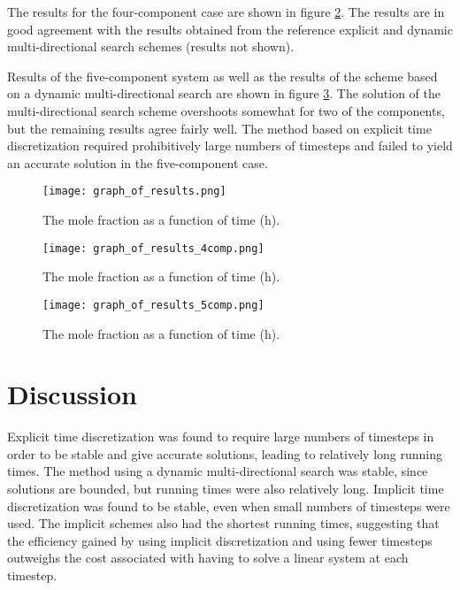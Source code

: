 \documentclass[11]{Report}
\begin{document}
The results for the four-component case are shown in figure \ref{fig:fig_2}. The results are in good agreement with the results obtained from the reference explicit and dynamic multi-directional search schemes (results not shown).

Results of the five-component system as well as the results of the scheme based on a dynamic multi-directional search are shown in figure \ref{fig:fig_3}. The solution of the multi-directional search scheme overshoots somewhat for two of the components, but the remaining results agree fairly well. The method based on explicit time discretization required prohibitively large numbers of timesteps and failed to yield an accurate solution in the five-component case.

\begin{figure}
\texttt{[image: graph\_of\_results.png]}
\caption{The mole fraction as a function of time (h).}
\label{fig:fig_1}
\end{figure}

\begin{figure}
\texttt{[image: graph\_of\_results\_4comp.png]}
\caption{The mole fraction as a function of time (h).}
\label{fig:fig_2}
\end{figure}

\begin{figure}
\texttt{[image: graph\_of\_results\_5comp.png]}
\caption{The mole fraction as a function of time (h).}
\label{fig:fig_3}
\end{figure}

\section*{Discussion}
Explicit time discretization was found to require large numbers of timesteps in order to be stable and give accurate solutions, leading to relatively long running times. The method using a dynamic multi-directional search was stable, since solutions are bounded, but running times were also relatively long. Implicit time discretization was found to be stable, even when small numbers of timesteps were used. The implicit schemes also had the shortest running times, suggesting that the efficiency gained by using implicit discretization and using fewer timesteps outweighs the cost associated with having to solve a linear system at each timestep.
\end{document}
